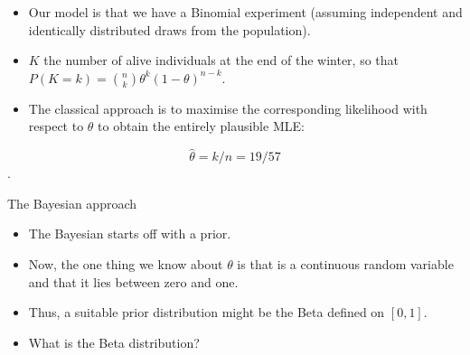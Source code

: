 \documentclass[
  ignorenonframetext,
  aspectratio=169]{beamer}
\providecommand{\tightlist}{%
  \setlength{\itemsep}{0pt}\setlength{\parskip}{0pt}}
\begin{document}
\begin{frame}
\begin{itemize}
\tightlist
\item
  Our model is that we have a Binomial experiment (assuming independent
  and identically distributed draws from the population).
\end{itemize}

\pause

\begin{itemize}
\tightlist
\item
  \(K\) the number of alive individuals at the end of the winter, so
  that \(P(K=k) = \binom{n}{k}\theta^k(1-\theta)^{n-k}\).
\end{itemize}

\pause

\begin{itemize}
\tightlist
\item
  The classical approach is to maximise the corresponding likelihood
  with respect to \(\theta\) to obtain the entirely plausible MLE:
\end{itemize}

\[ \hat{\theta} = k/n = 19/57\].
\end{frame}

\begin{frame}{The Bayesian approach}
\protect\hypertarget{the-bayesian-approach}{}
\begin{itemize}[<+->]
\tightlist
\item
  The Bayesian starts off with a prior.
\end{itemize}

\begin{itemize}[<+->]
\tightlist
\item
  Now, the one thing we know about \(\theta\) is that is a continuous
  random variable and that it lies between zero and one.
\end{itemize}

\begin{itemize}[<+->]
\tightlist
\item
  Thus, a suitable prior distribution might be the Beta defined on
  \([0,1]\).
\end{itemize}

\begin{itemize}[<+->]
\tightlist
\item
  What is the Beta distribution?
\end{itemize}
\end{frame}
\end{document}
